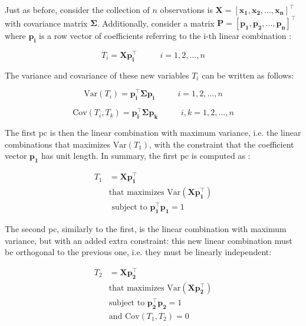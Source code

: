 Just as before, consider the  collection of $n$ observations is $\mathbf{X = [x_1, x_2, ..., x_n]^\intercal}$ with covariance matrix $\mathbf{\Sigma}$. Additionally, consider a matrix $\mathbf{P = [p_1, p_2, ..., p_n]^\intercal}$ where $\mathbf{p_i}$ is a row vector of coefficients referring to the i-th linear combination \parencite{johnson2013applied}:

\begin{equation}
	\label{eqn:pca-lincomb}
	T_i=\mathbf{Xp_i^\intercal} \;\;\;\;\;\;\;\;\;\; i = 1, 2, ..., n
\end{equation}

The variance and covariance of these new variables $T_i$ can be written as follows:

\begin{equation}
	\label{eqn:pca-var}
	\text{Var}(T_i) = \mathbf{p_i^\intercal \Sigma p_i} \;\;\;\;\;\;\;\;\;\; i = 1, 2, ..., n
\end{equation}

\begin{equation}
	\label{eqn:pca-cov}
	\text{Cov}(T_i, T_k) = \mathbf{p_i^\intercal \Sigma p_k}\;\;\;\;\;\;\;\;\;\; i,k= 1, 2, ..., n
\end{equation}

The first \acrfull{pc} is then the linear combination with maximum variance, i.e. the linear combinations that maximizes $\text{Var}(T_1)$, with the constraint that the coefficient vector $\mathbf{p_1}$ has unit length. In summary, the first \acrshort{pc} is computed as \parencite{johnson2013applied}:

\begin{equation}
	\label{eqn:pca-pc1}
	\begin{split}
		T_1 & =\mathbf{Xp_1^\intercal} \\
			   & \text{that maximizes Var}(\mathbf{Xp_1^\intercal}) \\
			   & \text{ subject to }  \mathbf{p_1^\intercal p_1} = 1
	\end{split}
\end{equation}

The second \acrshort{pc}, similarly to the first, is the linear combination with maximum variance, but with an added extra constraint: this new linear combination must be orthogonal to the previous one, i.e. they must be linearly independent:

\begin{equation}
	\label{eqn:pca-pc2}
	\begin{split}
		T_2 & =\mathbf{Xp_2^\intercal} \\
		& \text{that maximizes Var}(\mathbf{Xp_2^\intercal}) \\
		& \text{subject to }  \mathbf{p_2^\intercal p_2} = 1 \\
		& \text{and } \text{Cov}(T_1, T_2) = 0
	\end{split}
\end{equation}

